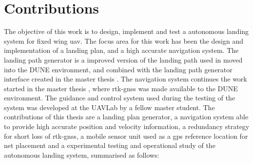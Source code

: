 \section{Contributions}
The objective of this work is to design, implement and test a autonomous landing system for fixed wing \gls{uav}. The focus area for this work has been the design and implementation of a landing plan, and a high accurate navigation system. The landing path generator is a improved version of the landing path used in \citep{Skulstad&Syversen} moved into the DUNE environment, and combined with the landing path generator interface created in the master thesis \citep{Froelich}. The navigation system continues the work started in the master thesis \citep{Spockeli}, where \gls{rtk-gnss} was made available to the DUNE environment. The guidance and control system used during the testing of the system was developed at the UAVLab by a fellow master student. The contributions of this thesis are a landing plan generator, a navigation system able to provide high accurate position and velocity information, a redundancy strategy for short loss of \gls{rtk-gnss}, a mobile sensor unit used as a \gls{gps} reference location for net placement and a experimental testing and operational study of the autonomous landing system, summarised as follows:
